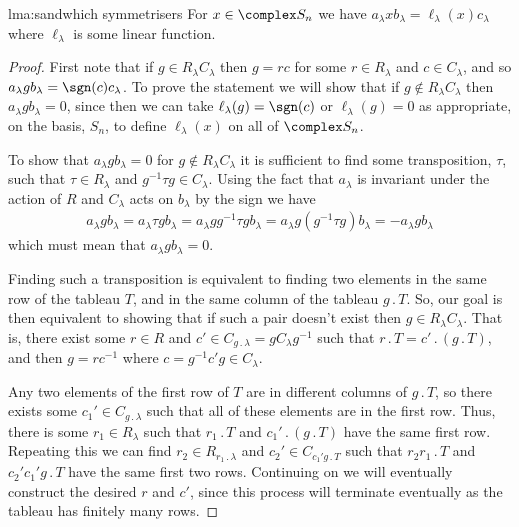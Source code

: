 \documentclass[fleqn]{NotesClass}
\newcommand{\action}{\mathbin{.}}
\newcommand{\rowGroup}{R}
\newcommand{\columnGroup}{C}
\begin{document}
    \begin{lma}{}{lma:sandwhich symmetrisers}
        For \(x \in \complex S_n\) we have \(a_\lambda x b_\lambda = \ell_\lambda(x)c_\lambda\) where \(\ell_\lambda\) is some linear function.
        \begin{proof}
            First note that if \(g \in \rowGroup_\lambda \columnGroup_\lambda\) then \(g = rc\) for some \(r \in \rowGroup_\lambda\) and \(c \in \columnGroup_\lambda\), and so \(a_\lambda g b_\lambda = \sgn(c) c_\lambda\).
            To prove the statement we will show that if \(g \notin \rowGroup_\lambda \columnGroup_\lambda\) then \(a_\lambda g b_\lambda = 0\), since then we can take \(\ell_\lambda(g) = \sgn(c)\) or \(\ell_\lambda(g) = 0\) as appropriate, on the basis, \(S_n\), to define \(\ell_\lambda(x)\) on all of \(\complex S_n\).
            
            To show that \(a_\lambda g b_\lambda = 0\) for \(g \notin \rowGroup_\lambda \columnGroup_\lambda\) it is sufficient to find some transposition, \(\tau\), such that \(\tau \in \rowGroup_\lambda\) and \(g^{-1}\tau g \in \columnGroup_\lambda\).
            Using the fact that \(a_\lambda\) is invariant under the action of \(\rowGroup\) and \(\columnGroup_\lambda\) acts on \(b_\lambda\) by the sign we have
            \begin{align}
                a_\lambda g b_\lambda = a_\lambda \tau g b_\lambda = a_\lambda gg^{-1}\tau gb_\lambda = a_\lambda g(g^{-1}\tau g)b_\lambda = -a_\lambda g b_\lambda
            \end{align}
            which must mean that \(a_\lambda g b_\lambda = 0\).
            
            Finding such a transposition is equivalent to finding two elements in the same row of the tableau \(T\), and in the same column of the tableau \(g \action T\).
            So, our goal is then equivalent to showing that if such a pair doesn't exist then \(g \in \rowGroup_\lambda \columnGroup_\lambda\).
            That is, there exist some \(r \in \rowGroup\) and \(c' \in \columnGroup_{g \action \lambda} = g \columnGroup_\lambda g^{-1}\) such that \(r \action T = c' \action (g \action T)\), and then \(g = rc^{-1}\) where \(c = g^{-1}c'g \in \columnGroup_\lambda\).
            
            Any two elements of the first row of \(T\) are in different columns of \(g \action T\), so there exists some \(c_1' \in \columnGroup_{g \action \lambda}\) such that all of these elements are in the first row.
            Thus, there is some \(r_1 \in \rowGroup_\lambda\) such that \(r_1 \action T\) and \(c_1' \action (g \action T)\) have the same first row.
            Repeating this we can find \(r_2 \in \rowGroup_{r_1 \action \lambda}\) and \(c_2' \in \columnGroup_{c_1'g \action T}\) such that \(r_2r_1 \action T\) and \(c_2'c_1'g \action T\) have the same first two rows.
            Continuing on we will eventually construct the desired \(r\) and \(c'\), since this process will terminate eventually as the tableau has finitely many rows.
        \end{proof}
    \end{lma}
    
\end{document}

